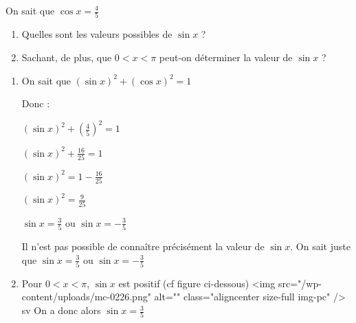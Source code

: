 
%
On sait que $\cos x = \frac{4}{5}$
\begin{enumerate}
     \item
     Quelles sont les valeurs possibles de $\sin x$ ?
     \item
     Sachant, de plus, que $0 < x < \pi $ peut-on déterminer la valeur de $\sin x$ ?
\end{enumerate}
\begin{corrige}
     \begin{enumerate}
          \item
          On sait que $\left(\sin x\right)^{2}+\left(\cos x\right)^{2}=1$
          \par
          Donc :
          \par
          $\left(\sin x\right)^{2}+\left(\frac{4}{5}\right)^{2}=1$
          \par
          $\left(\sin x\right)^{2}+\frac{16}{25}=1$
          \par
          $\left(\sin x\right)^{2}=1-\frac{16}{25}$
          \par
          $\left(\sin x\right)^{2}=\frac{9}{25}$
          \par
          $\sin x=\frac{3}{5}$ ou $\sin x=-\frac{3}{5}$
          \par
          Il n'est pas possible de connaître précisément la valeur de $\sin x$. On sait juste que $\sin x=\frac{3}{5}$ ou $\sin x=-\frac{3}{5}$
          \item
          Pour  $0 < x < \pi$, $\sin x$ est positif (cf figure ci-dessous)
          <img src="/wp-content/uploads/mc-0226.png" alt="" class="aligncenter size-full  img-pc" />
sv
          On a donc alors $\sin x=\frac{3}{5}$
     \end{enumerate}
\end{corrige}
